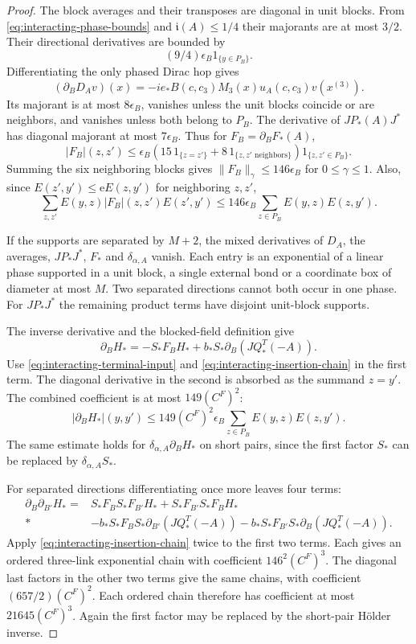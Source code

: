 \begin{proof}
The block averages and their transposes are diagonal
in unit blocks. From
\eqref{eq:interacting-phase-bounds} and
$\mathfrak i(A)\le1/4$ their majorants are at most
$3/2$. Their directional derivatives are bounded by
\[
                 (9/4)\epsilon_B1_{\{y\in P_B\}}.
\]
Differentiating the only phased Dirac hop gives
\[
 (\partial_BD_Av)(x)=
        -ie_*B(c,c_3)M_3(x)u_A(c,c_3)v(x^{(3)}).
\]
Its majorant is at most $8\epsilon_B$, vanishes
unless the unit blocks coincide or are neighbors,
and vanishes unless both belong to $P_B$.
The derivative of $JP_*(A)J^*$ has diagonal
majorant at most $7\epsilon_B$. Thus for
$F_B=\partial_BF_*(A)$,
\[
 |F_B|(z,z')\le\epsilon_B
       (15\,1_{\{z=z'\}}+8\,1_{\{z,z'\text{ neighbors}\}})
                                      1_{\{z,z'\in P_B\}}.
\]
Summing the six neighboring blocks gives
$\|F_B\|_\gamma\le146\epsilon_B$ for $0\le\gamma\le1$.
Also, since $E(z',y')\le\mathrm eE(z,y')$ for
neighboring $z,z'$,
\begin{equation}\label{eq:interacting-insertion-chain}
 \sum_{z,z'}E(y,z)|F_B|(z,z')E(z',y')
        \le146\epsilon_B\sum_{z\in P_B}E(y,z)E(z,y').
\end{equation}

If the supports are separated by $M+2$, the mixed
derivatives of $D_A$, the averages, $JP_*J^*$,
$F_*$ and $\delta_{\alpha,A}$ vanish. Each entry
is an exponential of a linear phase supported
in a unit block, a single external bond or a
coordinate box of diameter at most $M$.
Two separated directions cannot both occur in
one phase. For $JP_*J^*$ the remaining product
terms have disjoint unit-block supports.

The inverse derivative and the blocked-field
definition give
\[
 \partial_BH_*=-S_*F_BH_*+
               b_*S_*\partial_B(JQ_*^T(-A)).
\]
Use \eqref{eq:interacting-terminal-input} and
\eqref{eq:interacting-insertion-chain} in the first
term. The diagonal derivative in the second
is absorbed as the summand $z=y'$. The combined
coefficient is at most $149(C^F)^2$:
\begin{equation}\label{eq:interacting-H-first}
 |\partial_BH_*|(y,y')
 \le149(C^F)^2\epsilon_B
                    \sum_{z\in P_B}E(y,z)E(z,y').
\end{equation}
The same estimate holds for
$\delta_{\alpha,A}\partial_BH_*$ on short pairs,
since the first factor $S_*$ can be replaced
by $\delta_{\alpha,A}S_*$.

For separated directions differentiating once more
leaves four terms:
\begin{align*}
 \partial_B\partial_{B'}H_*={}&
 S_*F_BS_*F_{B'}H_*+S_*F_{B'}S_*F_BH_*\\*
 &-b_*S_*F_BS_*\partial_{B'}(JQ_*^T(-A))
  -b_*S_*F_{B'}S_*\partial_B(JQ_*^T(-A)).
\end{align*}
Apply \eqref{eq:interacting-insertion-chain} twice
to the first two terms. Each gives an ordered
three-link exponential chain with coefficient
$146^2(C^F)^3$. The diagonal last factors in
the other two terms give the same chains, with
coefficient $(657/2)(C^F)^2$. Each ordered
chain therefore has coefficient at most
$21645(C^F)^3$. Again the first factor may
be replaced by the short-pair Hölder inverse.


\end{proof}
